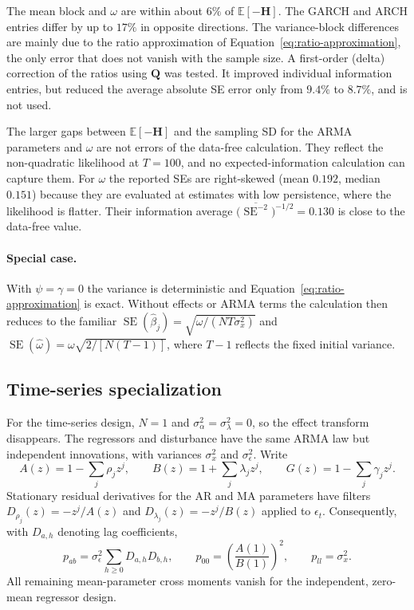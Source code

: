\documentclass[12pt]{article}
\begin{document}
The mean block and $\omega$ are within about $6\%$ of $\mathbb E[-\mathbf H]$. The GARCH and ARCH entries differ by up to $17\%$ in opposite directions. The variance-block differences are mainly due to the ratio approximation of Equation~\ref{eq:ratio-approximation}, the only error that does not vanish with the sample size. A first-order (delta) correction of the ratios using $\mathbf Q$ was tested. It improved individual information entries, but reduced the average absolute SE error only from $9.4\%$ to $8.7\%$, and is not used.

The larger gaps between $\mathbb E[-\mathbf H]$ and the sampling SD for the ARMA parameters and $\omega$ are not errors of the data-free calculation. They reflect the non-quadratic likelihood at $T=100$, and no expected-information calculation can capture them. For $\omega$ the reported SEs are right-skewed (mean $0.192$, median $0.151$) because they are evaluated at estimates with low persistence, where the likelihood is flatter. Their information average $\big(\overline{\operatorname{SE}^{-2}}\big)^{-1/2}=0.130$ is close to the data-free value.

\paragraph{Special case.} With $\psi=\gamma=0$ the variance is deterministic and Equation~\ref{eq:ratio-approximation} is exact. Without effects or ARMA terms the calculation then reduces to the familiar $\operatorname{SE}(\widehat\beta_j)=\sqrt{\omega/(NT\sigma_x^2)}$ and $\operatorname{SE}(\widehat\omega)=\omega\sqrt{2/[N(T-1)]}$, where $T-1$ reflects the fixed initial variance.

\subsection{Time-series specialization}\label{sec:df-time}
For the time-series design, $N=1$ and $\sigma_\alpha^2=\sigma_\lambda^2=0$, so the effect transform disappears. The regressors and disturbance have the same ARMA law but independent innovations, with variances $\sigma_x^2$ and $\sigma_\epsilon^2$. Write
\[
A(z)=1-\sum_j\rho_jz^j,\qquad B(z)=1+\sum_j\lambda_jz^j,\qquad
G(z)=1-\sum_j\gamma_jz^j.
\]
Stationary residual derivatives for the AR and MA parameters have filters
$D_{\rho_j}(z)=-z^j/A(z)$ and $D_{\lambda_j}(z)=-z^j/B(z)$ applied to $\epsilon_t$.
Consequently, with $D_{a,h}$ denoting lag coefficients,
\begin{equation}
p_{ab}=\sigma_\epsilon^2\sum_{h\ge0}D_{a,h}D_{b,h},\qquad
p_{00}=\left(\frac{A(1)}{B(1)}\right)^2,\qquad p_{ll}=\sigma_x^2.
\label{eq:df-time-mean-moments}
\end{equation}
All remaining mean-parameter cross moments vanish for the independent, zero-mean regressor design.
\end{document}
